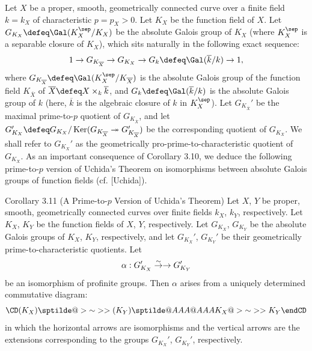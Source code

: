 Let $X$ be a proper, smooth, geometrically connected curve over a finite field $k=k_X$
of characteristic $p=p_X>0$. 
Let $K_X$ be the function field of $X$. Let $G_{K_{X}}\defeq \Gal (K_X^{\sep}/K_X)$ 
be the absolute Galois group of $K_X$ (where $K_X^{\sep}$ is a separable closure of
$K_X$), which sits naturally in the following exact sequence:
$$1\to G_{K_{\overline X}}\to G_{K_{X}} \to G_k\defeq \Gal (\overline k/k)\to 1,$$
where $G_{K_{\overline X}}\defeq \Gal (K_X^{\sep}/K_{\overline X})$  is the absolute 
Galois group of the function field
$K_{\overline X}$ of $\overline X\defeq X\times _{k}\overline {k}$, and 
$G_k\defeq \Gal (\overline k/k)$ is the absolute Galois group of $k$
(here, $\overline k$ is the algebraic closure of $k$ in $K_X^{\sep}$).
Let $G_{K_{\overline X}}'$ be the maximal prime-to-$p$ 
quotient of $G_{K_{\overline X}}$, and let $G_{K_{X}}'\defeq G_{K_X}/\Ker 
(G_{K_{\overline X}}\twoheadrightarrow  G_{K_{\overline X}}')$ 
be the corresponding quotient of 
$G_{K_{X}}$. We shall refer to $G_{K_{X}}'$ as the geometrically 
pro-prime-to-characteristic 
quotient of $G_{K_{X}}$. As an important consequence of Corollary 3.10, we deduce the 
following prime-to-$p$ version of Uchida's Theorem on isomorphisms between absolute 
Galois groups of function fields  (cf. [Uchida]).

\proclaim 
{Corollary 3.11 (A Prime-to-$p$ Version of Uchida's Theorem)} 
Let $X$, $Y$ be proper, smooth, geometrically connected 
curves over finite fields $k_X$, $k_Y$, respectively. 
Let $K_X$, $K_Y$ be the function fields of $X$, $Y$, respectively. Let $G_{K_{X}}$,
$G_{K_{Y}}$ be the absolute Galois groups of $K_X$, $K_Y$, respectively, 
and let $G_{K_{X}}'$, $G_{K_{Y}}'$ be their geometrically 
prime-to-characteristic quotients. Let 
$$\alpha : G_{K_{X}}'\overset \sim \to \rightarrow G_{K_{Y}}'$$
be an isomorphism of profinite groups. Then $\alpha$ arises from a uniquely 
determined commutative diagram:
$$
\CD
(K_X)\sptilde @>{\sim}>> (K_Y)\sptilde \\
@AAA              @AAA \\
K_{X} @>{\sim}>> K_{Y} \\
\endCD
$$
in which the horizontal arrows are isomorphisms and the vertical arrows are the 
extensions corresponding to the groups $G_{K_{X}}'$,  $G_{K_{Y}}'$, respectively.
\endproclaim


